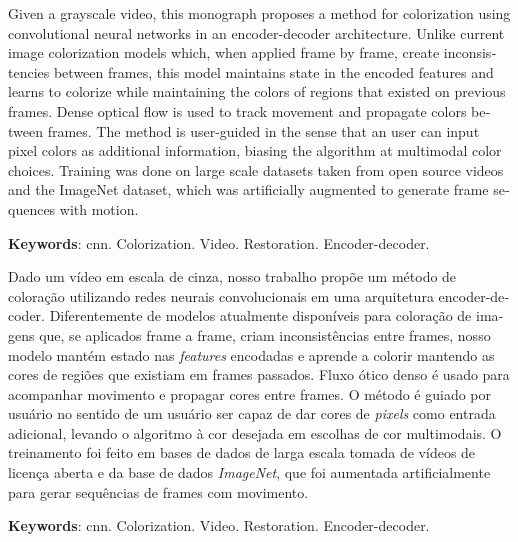 \documentclass[12pt,openright,oneside,a4paper,english, brazilian]{abntex2}
\begin{document}
\begin{otherlanguage}{english}
\begin{resumo}
Given a grayscale video, this monograph proposes a method for colorization using convolutional neural networks in an encoder-decoder architecture. Unlike current image colorization models which, when applied frame by frame, create inconsistencies between frames, this model maintains state in the encoded features and learns to colorize while maintaining the colors of regions that existed on previous frames. Dense optical flow is used to track movement and propagate colors between frames. The method is user-guided in the sense that an user can input pixel colors as additional information, biasing the algorithm at multimodal color choices. Training was done on large scale datasets taken from open source videos and the ImageNet dataset, which was artificially augmented to generate frame sequences with motion.

\vspace{\onelineskip}

\noindent

\textbf{Keywords}: \acrshort{cnn}. Colorization. Video. Restoration. Encoder-decoder.
\end{resumo}

\begin{resumo}[Resumo]
Dado um vídeo em escala de cinza, nosso trabalho propõe um método de coloração utilizando redes neurais convolucionais em uma arquitetura encoder-decoder. Diferentemente de modelos atualmente disponíveis para coloração de imagens que, se aplicados frame a frame, criam inconsistências entre frames, nosso modelo mantém estado nas \textit{features} encodadas e aprende a colorir mantendo as cores de regiões que existiam em frames passados. Fluxo ótico denso é usado para acompanhar movimento e propagar cores entre frames. O método é guiado por usuário no sentido de um usuário ser capaz de dar cores de \textit{pixels} como entrada adicional, levando o algoritmo à cor desejada em escolhas de cor multimodais. O treinamento foi feito em bases de dados de larga escala tomada de vídeos de licença aberta e da base de dados \textit{ImageNet}, que foi aumentada artificialmente para gerar sequências de frames com movimento.

\vspace{\onelineskip}

\noindent

\textbf{Keywords}: \acrshort{cnn}. Colorization. Video. Restoration. Encoder-decoder.
\end{resumo}



\end{otherlanguage}
\end{document}
